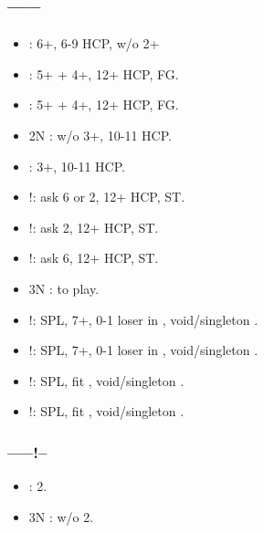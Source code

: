 \documentclass[12pt,twoside,a5paper]{report}%
\begin{document}

	\subsection*{------}
	\begin{itemize}
	\renewcommand{\labelitemi}{}
	\item {} : 6+\di{}, 6-9 HCP, w/o 2+\cl{}
	\item {} : 5+\di{} + 4+\he{}, 12+ HCP, FG.
	\item {} : 5+\di{} + 4+\sp{}, 12+ HCP, FG.
	\item 2N : w/o 3+\cl{}, 10-11 HCP.
	\item {} : 3+\cl{}, 10-11 HCP.
	\item {}!: ask 6\cl{} or 2\di{}, 12+ HCP, ST.
	\item {}!: ask 2\di{}, 12+ HCP, ST.
	\item {}!: ask 6\cl{}, 12+ HCP, ST.
	\item 3N : to play.
	\item {}!: SPL, 7+\di{}, 0-1 loser in \di{}, void/singleton \he{}.
	\item {}!: SPL, 7+\di{}, 0-1 loser in \di{}, void/singleton \sp{}.
	\item {}!: SPL, fit \cl{}, void/singleton \he{}.
	\item {}!: SPL, fit \cl{}, void/singleton \sp{}.	
	\end{itemize}

	\subsubsection*{------!--}
	\begin{itemize}
	\renewcommand{\labelitemi}{}
	\item {} : 2\di{}.
	\item 3N : w/o 2\di{}.
	\end{itemize}
\end{document}
